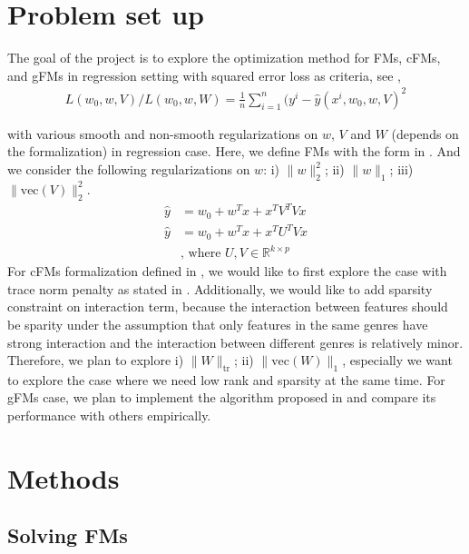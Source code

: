 \documentclass{article}
\newcommand{\tr}{\text{tr}}
\newcommand{\vecc}{\text{vec}}
\begin{document}
\section{Problem set up}


The goal of the project is to explore the optimization method for FMs, cFMs, and gFMs in regression setting with squared error loss as criteria, see ,
\begin{align}
  L(w_0, w, V)/L(w_0, w, W) = \frac{1}{n}\sum_{i = 1}^n (y^i - \hat{y}(x^i, w_0, w, V)^2 \label{eq:criteria}
\end{align}

with various smooth and non-smooth regularizations on $w$, $V$ and $W$ (depends on the formalization) in regression case. Here, we define FMs with the form in . And we consider the following regularizations on $w$: i) $\|w\|_2^2$; ii) $\|w\|_1$; iii) $\|\vecc(V)\|_2^2$. 
\begin{align}
  \hat{y} &= w_0 + w^T x + x^T V^TV x \label{eq:fm} \\
  \hat{y} &= w_0 + w^T x + x^T U^TV x \label{eq:gfm} \\
& \text{, where $U, V \in \mathbb{R}^{k \times p}$} \nonumber
\end{align}
For cFMs formalization defined in , we would like to first explore the case with trace norm penalty as stated in \cite{convexFM_paper}. Additionally, we would like to add sparsity constraint on interaction term, because the interaction between features should be sparity under the assumption that only features in the same genres have strong interaction and the interaction between different genres is relatively minor. Therefore, we plan to explore i) $\|W\|_{\tr}$; ii) $\|\vecc(W)\|_1$, especially we want to explore the case where we need low rank and sparsity at the same time. For gFMs case, we plan to implement the algorithm proposed in \cite{generalizedFM_paper} and compare its performance with others empirically.


\section{Methods}


\subsection{Solving FMs}
\end{document}
